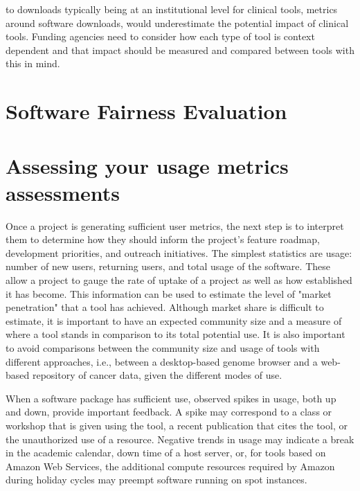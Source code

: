 \documentclass{article}
\begin{document}
to downloads typically being at an institutional level for clinical tools, metrics around software downloads, would underestimate the potential impact of clinical tools. Funding agencies need to consider how each type of tool is context dependent and that impact should be measured and compared between tools with this in mind.  

\section{Software Fairness Evaluation}

\section{Assessing your usage metrics assessments}
Once a project is generating sufficient user metrics, the next step is to interpret them to determine how they should inform the project's feature roadmap, development priorities, and outreach initiatives. The simplest statistics are usage: number of new users, returning users, and total usage of the software. These allow a project to gauge the rate of uptake of a project as well as how established it has become. This information can be used to estimate the level of "market penetration" that a tool has achieved. Although market share is difficult to estimate, it is important to have an expected community size and a measure of where a tool stands in comparison to its total potential use. It is also important to avoid comparisons between the community size and usage of tools with different approaches, i.e., between a desktop-based genome browser and a web-based repository of cancer data, given the different modes of use. 

When a software package has sufficient use, observed spikes in usage, both up and down, provide important feedback. A spike may correspond to a class or workshop that is given using the tool, a recent publication that cites the tool, or the unauthorized use of a resource. Negative trends in usage may indicate a break in the academic calendar, down time of a host server, or, for tools based on Amazon Web Services, the additional compute resources required by Amazon during holiday cycles may preempt software running on spot instances. 
\end{document}
